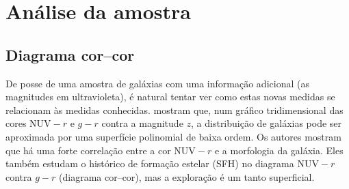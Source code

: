 



\chapter{Análise da amostra \STARLIGHTUV}
\label{sec:Analise}



\section{Diagrama cor--cor}

De posse de uma amostra de galáxias com uma informação adicional (as magnitudes
em ultravioleta), é natural tentar ver como estas novas medidas se relacionam às
medidas conhecidas. \citet{Chilingarian2011} mostram que, num gráfico
tridimensional das cores $\mathrm{NUV}-r$ e $g-r$ contra a magnitude $z$, a
distribuição de galáxias pode ser aproximada por uma superfície polinomial de
baixa ordem. Os autores mostram que há uma forte correlação entre a cor
$\mathrm{NUV}-r$ e a morfologia da galáxia. Eles também estudam o histórico de
formação estelar (SFH) no diagrama $\mathrm{NUV}-r$ contra $g-r$ (diagrama
cor--cor), mas a exploração é um tanto superficial.

